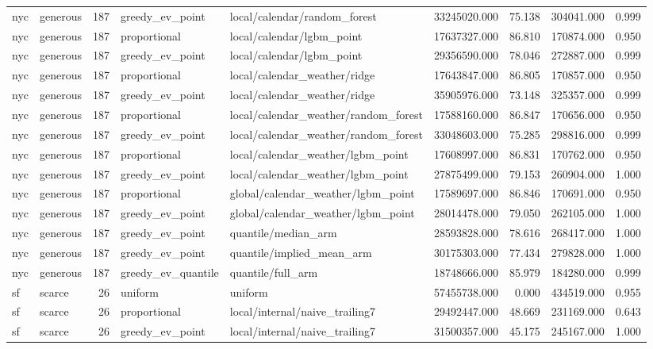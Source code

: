 \begin{tabular}{llrllrrrr}
nyc & generous & 187 & greedy\_ev\_point & local/calendar/random\_forest & 33245020.000 & 75.138 & 304041.000 & 0.999 \\
nyc & generous & 187 & proportional & local/calendar/lgbm\_point & 17637327.000 & 86.810 & 170874.000 & 0.950 \\
nyc & generous & 187 & greedy\_ev\_point & local/calendar/lgbm\_point & 29356590.000 & 78.046 & 272887.000 & 0.999 \\
nyc & generous & 187 & proportional & local/calendar\_weather/ridge & 17643847.000 & 86.805 & 170857.000 & 0.950 \\
nyc & generous & 187 & greedy\_ev\_point & local/calendar\_weather/ridge & 35905976.000 & 73.148 & 325357.000 & 0.999 \\
nyc & generous & 187 & proportional & local/calendar\_weather/random\_forest & 17588160.000 & 86.847 & 170656.000 & 0.950 \\
nyc & generous & 187 & greedy\_ev\_point & local/calendar\_weather/random\_forest & 33048603.000 & 75.285 & 298816.000 & 0.999 \\
nyc & generous & 187 & proportional & local/calendar\_weather/lgbm\_point & 17608997.000 & 86.831 & 170762.000 & 0.950 \\
nyc & generous & 187 & greedy\_ev\_point & local/calendar\_weather/lgbm\_point & 27875499.000 & 79.153 & 260904.000 & 1.000 \\
nyc & generous & 187 & proportional & global/calendar\_weather/lgbm\_point & 17589697.000 & 86.846 & 170691.000 & 0.950 \\
nyc & generous & 187 & greedy\_ev\_point & global/calendar\_weather/lgbm\_point & 28014478.000 & 79.050 & 262105.000 & 1.000 \\
nyc & generous & 187 & greedy\_ev\_point & quantile/median\_arm & 28593828.000 & 78.616 & 268417.000 & 1.000 \\
nyc & generous & 187 & greedy\_ev\_point & quantile/implied\_mean\_arm & 30175303.000 & 77.434 & 279828.000 & 1.000 \\
nyc & generous & 187 & greedy\_ev\_quantile & quantile/full\_arm & 18748666.000 & 85.979 & 184280.000 & 0.999 \\
sf & scarce & 26 & uniform & uniform & 57455738.000 & 0.000 & 434519.000 & 0.955 \\
sf & scarce & 26 & proportional & local/internal/naive\_trailing7 & 29492447.000 & 48.669 & 231169.000 & 0.643 \\
sf & scarce & 26 & greedy\_ev\_point & local/internal/naive\_trailing7 & 31500357.000 & 45.175 & 245167.000 & 1.000 \\

\end{tabular}
